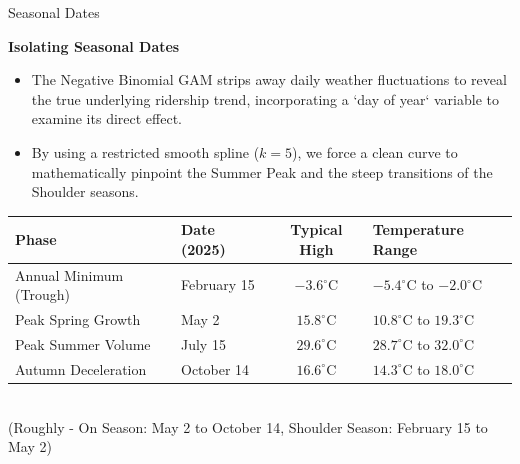 \documentclass[10pt, aspectratio=169]{beamer}
\begin{document}
\begin{frame}{Seasonal Dates}
    


    \textbf{Isolating Seasonal Dates}
\begin{itemize}
    \item The Negative Binomial GAM strips away daily weather fluctuations to reveal the true underlying ridership trend, incorporating a `day of year` variable to examine its direct effect.
    \item By using a restricted smooth spline ($k=5$), we force a clean curve to mathematically pinpoint the Summer Peak and the steep transitions of the Shoulder seasons.
\end{itemize}

       \vspace{0.2cm}
    \begin{table}
        \centering
        \small
        \renewcommand{\arraystretch}{1.5}
        \begin{tabular}{@{}llcl@{}}
            \toprule
            \textbf{Phase} & \textbf{Date (2025)} & \textbf{Typical High} & \textbf{Temperature Range} \\
            \midrule
            Annual Minimum (Trough) & February 15 & $-3.6^\circ\text{C}$ & $-5.4^\circ\text{C}$ to $-2.0^\circ\text{C}$ \\
            Peak Spring Growth & May 2 & $15.8^\circ\text{C}$ & $10.8^\circ\text{C}$ to $19.3^\circ\text{C}$ \\
            Peak Summer Volume & July 15 & $29.6^\circ\text{C}$ & $28.7^\circ\text{C}$ to $32.0^\circ\text{C}$ \\
            Autumn Deceleration & October 14 & $16.6^\circ\text{C}$ & $14.3^\circ\text{C}$ to $18.0^\circ\text{C}$ \\
            \bottomrule
        \end{tabular}
\vspace{2}
\\
        (Roughly - On Season: May 2 to October 14, Shoulder Season: February 15 to May 2)
    \end{table}
    
\end{frame}
\end{document}
